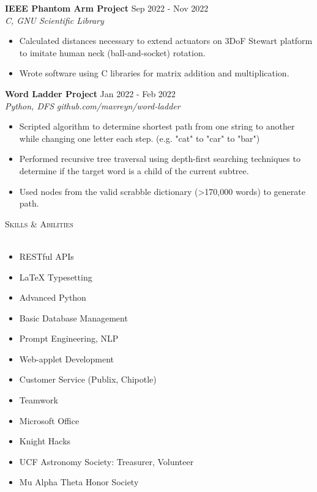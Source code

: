 \documentclass[letterpaper]{article}
\newcommand{\lineunder} {
    \vspace*{-8pt} \\
    \hspace*{-18pt} \hrulefill \\
}
\newcommand{\header} [1] {
    {\hspace*{-18pt}\vspace*{12pt} \large\textsc{#1}}
    \vspace*{-12pt} \lineunder
}
\begin{document}
\textbf{IEEE Phantom Arm Project} \hfill Sep 2022 - Nov 2022\\
\textit{C, GNU Scientific Library} \\
\vspace{-1mm}
\begin{itemize} \itemsep 1pt
	\item Calculated distances necessary to extend actuators on 3DoF Stewart platform to imitate human neck (ball-and-socket) rotation.
	\item Wrote software using C libraries for matrix addition and multiplication.
\end{itemize}

\textbf{Word Ladder Project} \hfill Jan 2022 - Feb 2022\\
\textit{Python, DFS} \hfill \textit{github.com/mavreyn/word-ladder}\\
\vspace{-1mm}
\begin{itemize} \itemsep 1pt
	\item Scripted algorithm to determine shortest path from one string to another while changing one letter each step. (e.g. "cat" to "car" to "bar")
	\item Performed recursive tree traversal using depth-first searching techniques to determine if the target word is a child of the current subtree.
    \item Used nodes from the valid scrabble dictionary (>170,000 words) to generate path.
\end{itemize}

\vspace{2mm}


\header{Skills \& Abilities}
\begin{multicols}{2}
    \begin{itemize} \itemsep 1pt
        \item RESTful APIs
        \item LaTeX Typesetting
        \item Advanced Python
        \item Basic Database Management
        \item Prompt Engineering, NLP
        \item Web-applet Development
        \item Customer Service (Publix, Chipotle)
        \item Teamwork
        \item Microsoft Office
        \item Knight Hacks
        \item UCF Astronomy Society: Treasurer, Volunteer
        \item Mu Alpha Theta Honor Society
    \end{itemize}
\end{multicols}
\end{document}
